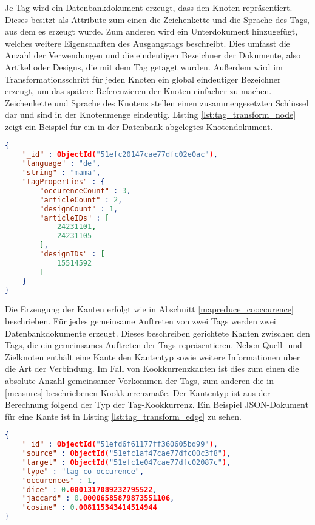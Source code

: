 Je Tag wird ein Datenbankdokument erzeugt, dass den Knoten repräsentiert. Dieses besitzt als Attribute zum einen die Zeichenkette und die Sprache des Tags, aus dem es erzeugt wurde. Zum anderen wird ein Unterdokument hinzugefügt, welches weitere Eigenschaften des Ausgangstags beschreibt. Dies umfasst die Anzahl der Verwendungen und die eindeutigen Bezeichner der Dokumente, also Artikel oder Designs, die mit dem Tag getaggt wurden. Außerdem wird im Transformationsschritt für jeden Knoten ein global eindeutiger Bezeichner erzeugt, um das spätere Referenzieren der Knoten einfacher zu machen. Zeichenkette und Sprache des Knotens stellen einen zusammengesetzten Schlüssel dar und sind in der Knotenmenge eindeutig. Listing \ref{lst:tag_transform_node} zeigt ein Beispiel für ein in der Datenbank abgelegtes Knotendokument.

\begin{lstlisting}[language=json, label={lst:tag_transform_node}, caption={Tag-Knoten als JSON-Dokument}]
{
    "_id" : ObjectId("51efc20147cae77dfc02e0ac"),
    "language" : "de",
    "string" : "mama",
    "tagProperties" : {
        "occurenceCount" : 3,
        "articleCount" : 2,
        "designCount" : 1,
        "articleIDs" : [
            24231101,
            24231105
        ],
        "designIDs" : [
            15514592
        ]
    }
}
\end{lstlisting}

Die Erzeugung der Kanten erfolgt wie in Abschnitt \ref{mapreduce_cooccurence} beschrieben. Für  jedes gemeinsame Auftreten von zwei Tags werden zwei Datenbankdokumente erzeugt. Dieses beschreiben gerichtete Kanten zwischen den Tags, die ein gemeinsames Auftreten der Tags repräsentieren. Neben Quell- und Zielknoten enthält eine Kante den Kantentyp sowie weitere Informationen über die Art der Verbindung. Im Fall von Kookkurrenzkanten ist dies zum einen die absolute Anzahl gemeinsamer Vorkommen der Tags, zum anderen die in \ref{measures} beschriebenen Kookkurrenzmaße. Der Kantentyp ist aus der Berechnung folgend der Typ der Tag-Kookkurrenz. Ein Beispiel JSON-Dokument für eine Kante ist in Listing \ref{lst:tag_transform_edge} zu sehen.

\begin{lstlisting}[language=json, label={lst:tag_transform_edge}, caption={Tag-Kante als JSON-Dokument}]
{
    "_id" : ObjectId("51efd6f61177ff360605bd99"),
    "source" : ObjectId("51efc1af47cae77dfc00c3f8"),
    "target" : ObjectId("51efc1e047cae77dfc02087c"),
    "type" : "tag-co-occurence",
    "occurences" : 1,
    "dice" : 0.0001317089232795522,
    "jaccard" : 0.00006585879873551106,
    "cosine" : 0.008115343414514944
}
\end{lstlisting}

